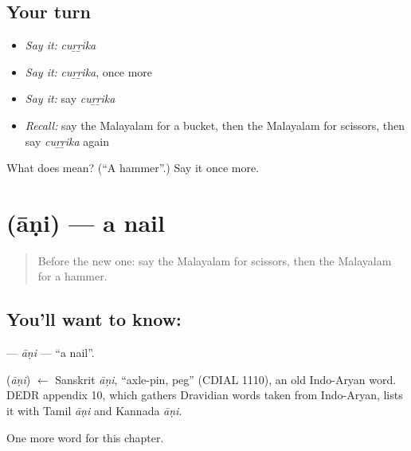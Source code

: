 \subsection*{Your turn}
\begin{itemize}
\raggedright
  \item \emph{Say it:} \emph{cuṟṟika}
  \item \emph{Say it:} \emph{cuṟṟika}, once more
  \item \emph{Say it:} say \emph{cuṟṟika}
  \item \emph{Recall:} say the Malayalam for a bucket, then the Malayalam for scissors, then say \emph{cuṟṟika} again
\end{itemize}

\begin{tcolorbox}[breakable,colback=teal!4,colframe=teal!35!black,title={Before you move on}]
What does  mean? (\textquotedblleft{}A hammer\textquotedblright{}.) Say it once more.
\end{tcolorbox}
\section[\texorpdfstring{\ml{ആണി} (āṇi)}{ആണി (āṇi)}]{ (āṇi) — a nail}

\label{lesson:ML-C159-ani}



\begin{quote}
Before the new one: say the Malayalam for scissors, then the Malayalam for a hammer.
\end{quote}

\subsection*{You'll want to know: }
\textbf{} — \emph{āṇi} — \textquotedblleft{}a nail\textquotedblright{}.

\begin{cousinweb}
\textbf{} (\emph{āṇi}) $\leftarrow$ Sanskrit \emph{āṇi}, \textquotedblleft{}axle-pin, peg\textquotedblright{} (CDIAL 1110), an old Indo-Aryan word. DEDR appendix 10, which gathers Dravidian words taken from Indo-Aryan, lists it with Tamil \emph{āṇi} and Kannada \emph{āṇi}.
\end{cousinweb}

\begin{grammarlens}[title={What you've built}]
One more word for this chapter.
\end{grammarlens}

